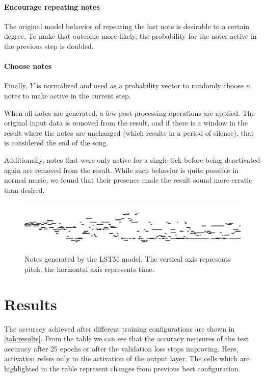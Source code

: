 \documentclass[11pt, twocolumn]{article}
\begin{document}
\paragraph{Encourage repeating notes} The original model behavior of repeating the last note is desirable to a certain degree. To make that outcome more likely, the probability for the notes active in the previous step is doubled.

\paragraph{Choose notes} Finally, $Y$ is normalized and used as a probability vector to randomly choose $n$ notes to make active in the current step.

\mbox{} %

When all notes are generated, a few post-processing operations are applied. The original input data is removed from the result, and if there is a window in the result where the notes are unchanged (which results in a period of silence), that is considered the end of the song. 

Additionally, notes that were only active for a single tick before being deactivated again are removed from the result. While such behavior is quite possible in normal music, we found that their presence made the result sound more erratic than desired. 

\begin{figure}[H]
    \includegraphics[width=\linewidth]{images/lstm_samples.png}
    \caption{Notes generated by the LSTM model. The vertical axis represents pitch, the horizontal axis represents time.}
    \label{fig:lstm_predicted}
\end{figure}

\section{Results}
\label{sec:results}
The accuracy achieved after different training configurations are shown in \autoref{tab:results}. From the table we can see that the accuracy measures of the test accuracy after 25 epochs or after the validation loss stops improving. Here, activation refers only to the activation of the output layer. The cells which are highlighted in the table represent changes from previous best configuration.
\end{document}
